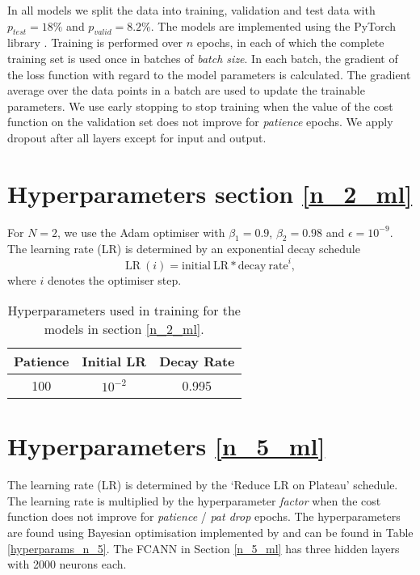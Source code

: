 In all models we split the data into training, validation and test data with $p_{test} = 18 \%$ and $p_{valid} = 8.2 \%$. 
The models are implemented using the PyTorch library \cite{NEURIPS2019_9015}. 
Training is performed over $n$ epochs, in each of which the complete training set is used once in batches of \textit{batch size}.
In each batch, the gradient of the loss function with regard to the model parameters is calculated.
The gradient average over the data points in a batch are used to update the trainable parameters.
We use early stopping to stop training when the value of the cost function on the validation set does not improve for \textit{patience} epochs.
We apply dropout \cite{hinton2012improving} after all layers except for input and output.

\section{Hyperparameters section \ref{n_2_ml}}
For $N=2$, we use the Adam optimiser with $\beta_1 = 0.9$, $\beta_2 = 0.98$ and $\epsilon = 10^{-9}$. The learning rate (LR) is determined by an exponential decay schedule
\begin{equation} \label{eds}
\mathrm{LR} \ (i) = \mathrm{initial \ LR} * \mathrm{decay \ rate}^i,
\end{equation}
where $i$ denotes the optimiser step.


\begin{table}[h]
	\centering
	\begin{tabular}{c | c | c }
		Patience & Initial LR & Decay Rate \\
		\hline
		100 & $10^{-2}$ & 0.995 \\
	\end{tabular}
	\caption{Hyperparameters used in training for the models in section \ref{n_2_ml}.}
	\label{hyperparams_n_2}
\end{table}

\section{Hyperparameters \ref{n_5_ml}}
The learning rate (LR) is determined by the `Reduce LR on Plateau' schedule.
The learning rate is multiplied by the hyperparameter \textit{factor} when the cost function does not improve for \textit{patience} / \textit{pat drop} epochs.
The hyperparameters are found using Bayesian optimisation implemented by \cite{wandb} and can be found in Table \ref{hyperparams_n_5}.
The FCANN in Section \ref{n_5_ml} has three hidden layers with 2000 neurons each.

